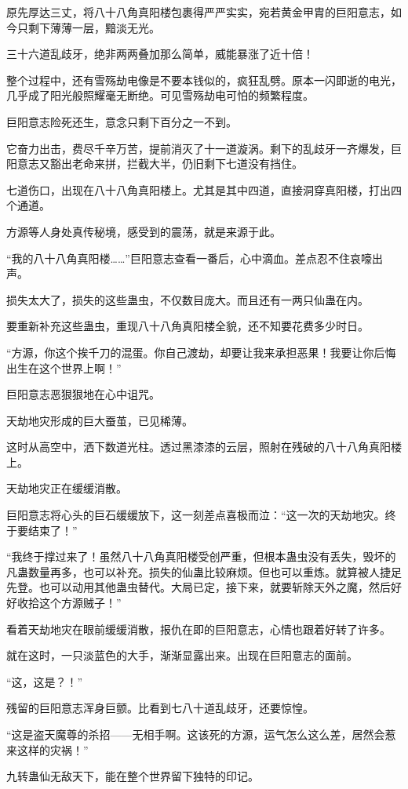 \begin{this_body}
原先厚达三丈，将八十八角真阳楼包裹得严严实实，宛若黄金甲胄的巨阳意志，如今只剩下薄薄一层，黯淡无光。

三十六道乱歧牙，绝非两两叠加那么简单，威能暴涨了近十倍！

整个过程中，还有雪殇劫电像是不要本钱似的，疯狂乱劈。原本一闪即逝的电光，几乎成了阳光般照耀毫无断绝。可见雪殇劫电可怕的频繁程度。

巨阳意志险死还生，意念只剩下百分之一不到。

它奋力出击，费尽千辛万苦，提前消灭了十一道漩涡。剩下的乱歧牙一齐爆发，巨阳意志又豁出老命来拼，拦截大半，仍旧剩下七道没有挡住。

七道伤口，出现在八十八角真阳楼上。尤其是其中四道，直接洞穿真阳楼，打出四个通道。

方源等人身处真传秘境，感受到的震荡，就是来源于此。

“我的八十八角真阳楼……”巨阳意志查看一番后，心中滴血。差点忍不住哀嚎出声。

损失太大了，损失的这些蛊虫，不仅数目庞大。而且还有一两只仙蛊在内。

要重新补充这些蛊虫，重现八十八角真阳楼全貌，还不知要花费多少时日。

“方源，你这个挨千刀的混蛋。你自己渡劫，却要让我来承担恶果！我要让你后悔出生在这个世界上啊！”

巨阳意志恶狠狠地在心中诅咒。

天劫地灾形成的巨大蚕茧，已见稀薄。

这时从高空中，洒下数道光柱。透过黑漆漆的云层，照射在残破的八十八角真阳楼上。

天劫地灾正在缓缓消散。

巨阳意志将心头的巨石缓缓放下，这一刻差点喜极而泣：“这一次的天劫地灾。终于要结束了！”

“我终于撑过来了！虽然八十八角真阳楼受创严重，但根本蛊虫没有丢失，毁坏的凡蛊数量再多，也可以补充。损失的仙蛊比较麻烦。但也可以重炼。就算被人捷足先登。也可以动用其他蛊虫替代。大局已定，接下来，就要斩除天外之魔，然后好好收拾这个方源贼子！”

看着天劫地灾在眼前缓缓消散，报仇在即的巨阳意志，心情也跟着好转了许多。

就在这时，一只淡蓝色的大手，渐渐显露出来。出现在巨阳意志的面前。

“这，这是？！”

残留的巨阳意志浑身巨颤。比看到七八十道乱歧牙，还要惊惶。

“这是盗天魔尊的杀招——无相手啊。这该死的方源，运气怎么这么差，居然会惹来这样的灾祸！”

九转蛊仙无敌天下，能在整个世界留下独特的印记。


\end{this_body}
